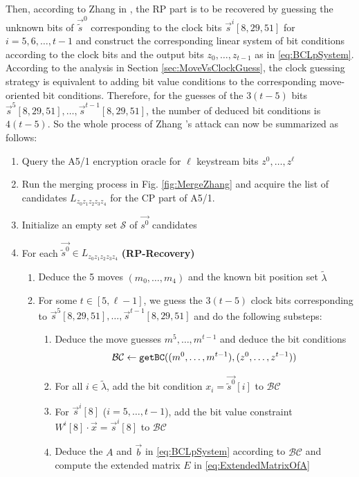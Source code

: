 Then, according to Zhang \etal in \cite{AC:Zhang19}, the RP part is to be recovered by guessing the unknown bits of $\vec{\tilde{s}}^0$ corresponding to the clock bits $\vec{s}^i[8,29,51]$ for $i=5,6,\ldots, t-1$ and construct the corresponding linear system of bit conditions according to the clock bits and the output bits $z_0,\ldots, z_{t-1}$ as in \eqref{eq:BCLpSystem}. 
According to the analysis in Section \ref{sec:MoveVsClockGuess}, the clock guessing strategy is equivalent to adding bit value conditions to the corresponding move-oriented bit conditions. 
Therefore, for the guesses of the $3(t-5)$ bits $\vec{s}^5[8,29,51], \ldots, \vec{s}^{t-1}[8,29,51]$, the number of deduced bit conditions is $4(t-5)$. 
So the whole process of Zhang \etal's attack can now be summarized as follows:
\begin{enumerate}
  \item Query the A5/1 encryption oracle for $\ell$ keystream bits $z^0,\ldots, z^{\ell}$
  \item Run the merging process in Fig. \ref{fig:MergeZhang} and acquire the list of candidates $L_{z_0z_1z_2z_3z_4}$ for the CP part of A5/1.
   \item Initialize an empty set $\mathcal{S}$ of $\vec{s^0}$ candidates
   \item For each $\vec{\tilde{s}^0}\in L_{z_0z_1z_2z_3z_4}$ \textbf{(RP-Recovery)}
   \begin{enumerate}
     \item Deduce the 5 moves $(m_0,\ldots, m_4)$ and the known bit position set $\tilde{\lambda}$
     \item For some $t \in [5,\ell-1]$, we guess the $3(t-5)$ clock bits corresponding to $\vec{s}^5[8,29,51], \ldots, \vec{s}^{t-1}[8,29,51]$ and do the following substeps:
     \begin{enumerate}
     \item Deduce the move guesses $m^5,\ldots, m^{t-1}$ and deduce the bit conditions 
     \[
     \mathcal{BC}\leftarrow {\tt getBC}((m^0,\ldots, m^{t-1}), (z^0,\ldots, z^{t-1}))
     \]
     \item For all $i\in \tilde{\lambda}$, add the bit condition $x_i=\vec{\tilde{s}^0}[i]$ to $\mathcal{BC}$
     \item For $\vec{s}^i[8]$ ($i=5,\ldots, t-1$), add the bit value constraint $W^{i}[8]\cdot \vec{x}=\vec{s}^i[8]$ to $\mathcal{BC}$
     \item Deduce the $A$ and $\vec b$ in \eqref{eq:BCLpSystem} according to $\mathcal{BC}$ and compute the extended matrix $E$ in \eqref{eq:ExtendedMatrixOfA}

\end{enumerate}
\end{enumerate}
\end{enumerate}
